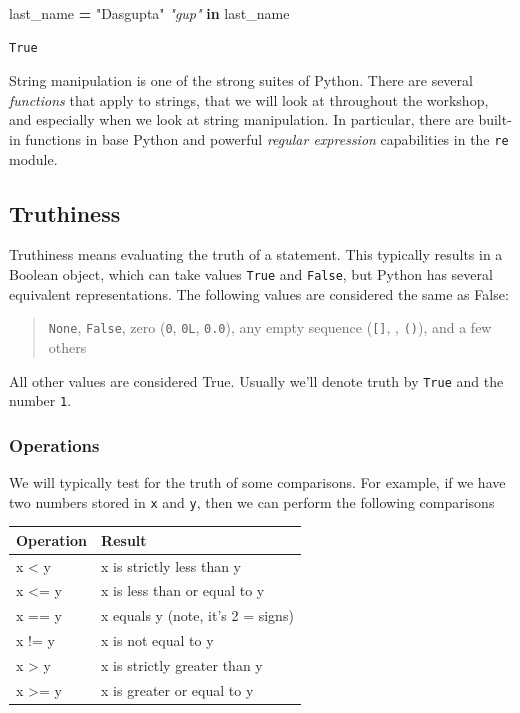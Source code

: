 \documentclass[
  letterpaper,
]{scrbook}
\newenvironment{Shaded}{\begin{snugshade}}{\end{snugshade}}
\newcommand{\CommentTok}[1]{\textcolor[rgb]{0.56,0.35,0.01}{\textit{#1}}}
\newcommand{\KeywordTok}[1]{\textcolor[rgb]{0.13,0.29,0.53}{\textbf{#1}}}
\newcommand{\NormalTok}[1]{#1}
\newcommand{\OperatorTok}[1]{\textcolor[rgb]{0.81,0.36,0.00}{\textbf{#1}}}
\newcommand{\StringTok}[1]{\textcolor[rgb]{0.31,0.60,0.02}{#1}}
\begin{document}
\begin{Shaded}
\begin{Highlighting}[]
\NormalTok{last_name }\OperatorTok{=} \StringTok{"Dasgupta"}
\CommentTok{"gup"} \KeywordTok{in}\NormalTok{ last_name}
\end{Highlighting}
\end{Shaded}

\begin{verbatim}
True
\end{verbatim}

String manipulation is one of the strong suites of Python.
There are several \emph{functions} that apply to strings, that we will look at throughout the workshop, and especially when we look at string manipulation. In particular, there are built-in functions in base Python and powerful \emph{regular expression} capabilities in the \texttt{re} module.

\hypertarget{truthiness}{%
\subsection{Truthiness}\label{truthiness}}

Truthiness means evaluating the truth of a statement. This typically results in a Boolean object, which can take values \texttt{True} and \texttt{False}, but Python has several equivalent representations. The following values are considered the same as False:

\begin{quote}
\texttt{None}, \texttt{False}, zero (\texttt{0}, \texttt{0L}, \texttt{0.0}), any empty sequence (\texttt{{[}{]}}, \texttt{\textquotesingle{}\textquotesingle{}}, \texttt{()}), and a few others
\end{quote}

All other values are considered True. Usually we'll denote truth by \texttt{True} and the number \texttt{1}.

\hypertarget{operations-1}{%
\subsubsection{Operations}\label{operations-1}}

We will typically test for the truth of some comparisons. For example, if we have two numbers stored in \texttt{x} and \texttt{y}, then we can perform the following comparisons

\begin{longtable}[]{@{}ll@{}}
\toprule
Operation & Result\tabularnewline
\midrule
\endhead
x \textless{} y & x is strictly less than y\tabularnewline
x \textless= y & x is less than or equal to y\tabularnewline
x == y & x equals y (note, it's 2 = signs)\tabularnewline
x != y & x is not equal to y\tabularnewline
x \textgreater{} y & x is strictly greater than y\tabularnewline
x \textgreater= y & x is greater or equal to y\tabularnewline
\bottomrule
\end{longtable}
\end{document}
